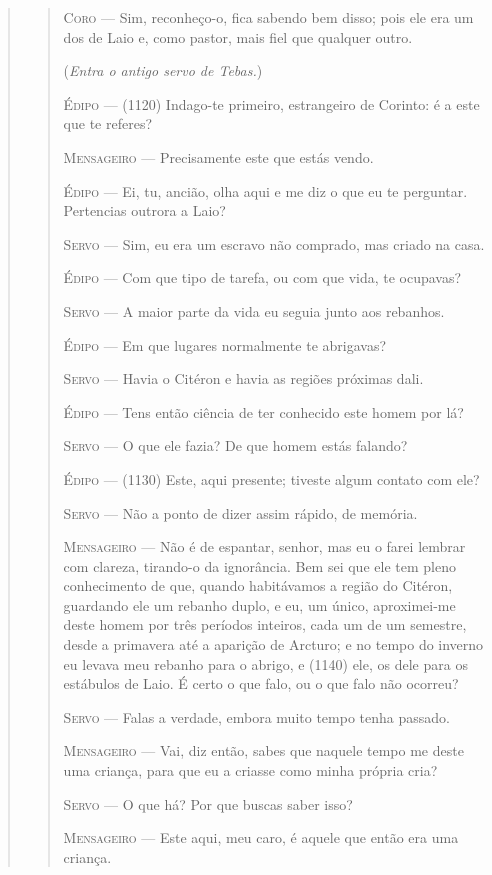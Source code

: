 \begin{verse}
\begin{verse}
\textsc{Coro} --- Sim, reconheço-o, fica sabendo bem disso; pois ele era um dos de Laio e,
como pastor, mais fiel que qualquer outro.

(\emph{Entra o antigo servo de Tebas.})

\textsc{Édipo} --- (1120) Indago-te primeiro, estrangeiro de Corinto: é a este que te
referes?

\textsc{Mensageiro} --- Precisamente este que estás vendo.

\textsc{Édipo} --- Ei, tu, ancião, olha aqui e me diz o que eu te perguntar. Pertencias
outrora a Laio?

\textsc{Servo} --- Sim, eu era um escravo não comprado, mas criado na casa.

\textsc{Édipo} --- Com que tipo de tarefa, ou com que vida, te ocupavas?

\textsc{Servo} --- A maior parte da vida eu seguia junto aos rebanhos.

\textsc{Édipo} --- Em que lugares normalmente te abrigavas?

\textsc{Servo} --- Havia o Citéron e havia as regiões próximas dali.

\textsc{Édipo} --- Tens então ciência de ter conhecido este homem por lá?

\textsc{Servo} --- O que ele fazia? De que homem estás falando?

\textsc{Édipo} --- (1130) Este, aqui presente; tiveste algum contato com ele?

\textsc{Servo} --- Não a ponto de dizer assim rápido, de memória.

\textsc{Mensageiro} --- Não é de espantar, senhor, mas eu o farei lembrar com clareza, tirando-o
da ignorância. Bem sei que ele tem pleno conhecimento de que, quando
habitávamos a região do Citéron, guardando ele um rebanho duplo, e eu,
um único, aproximei-me deste homem por três períodos inteiros, cada um
de um semestre, desde a primavera até a aparição de Arcturo; e no tempo
do inverno eu levava meu rebanho para o abrigo, e (1140) ele, os dele
para os estábulos de Laio. É certo o que falo, ou o que falo não
ocorreu?

\textsc{Servo} --- Falas a verdade, embora muito tempo tenha passado.

\textsc{Mensageiro} --- Vai, diz então, sabes que naquele tempo me deste uma criança, para que
eu a criasse como minha própria cria?

\textsc{Servo} --- O que há? Por que buscas saber isso?

\textsc{Mensageiro} --- Este aqui, meu caro, é aquele que então era uma criança.


\end{verse}
\end{verse}
